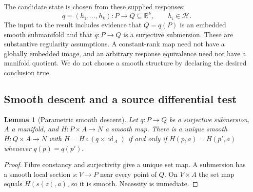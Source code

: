 \documentclass[11pt]{article}
\newtheorem{lemma}[theorem]{Lemma}
\theoremstyle{definition}
\theoremstyle{remark}\newtheorem{remark}[theorem]{Remark}
\newcommand{\R}{\mathbb R}
\newcommand{\id}{\operatorname{id}}
\begin{document}
The candidate state is chosen from these supplied responses:
\begin{equation}\label{s:eq:candidate}
 q=(h_1,\ldots,h_k):P\longrightarrow Q\subseteq\R^k,
 \qquad h_i\in\mathcal H.
\end{equation}
The input to the result includes evidence that $Q=q(P)$ is an embedded
smooth submanifold and that $q:P\to Q$ is a surjective submersion. These are
substantive regularity assumptions. A constant-rank map need not have a
globally embedded image, and an arbitrary response equivalence need not
have a manifold quotient. We do not choose a smooth structure by declaring
the desired conclusion true.

\subsection{Smooth descent and a source differential test}
\begin{lemma}[Parametric smooth descent]\label{s:lem:descent}
Let $q:P\to Q$ be a surjective submersion, $A$ a manifold, and
$H:P\times A\to N$ a smooth map. There is a unique smooth
$\bar H:Q\times A\to N$ with $H=\bar H\circ(q\times\id_A)$ if and only if
$H(p,a)=H(p',a)$ whenever $q(p)=q(p')$.
\end{lemma}
\begin{proof}
Fibre constancy and surjectivity give a unique set map. A submersion has a
smooth local section $s:V\to P$ near every point of $Q$. On $V\times A$ the
set map equals $H(s(z),a)$, so it is smooth. Necessity is immediate.
\end{proof}
\end{document}
